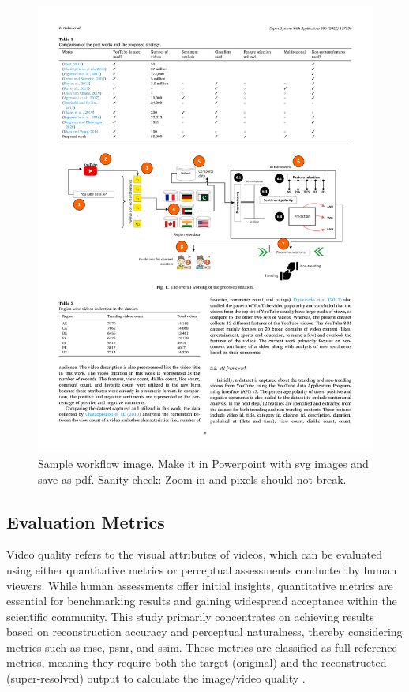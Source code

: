 \documentclass[conference]{IEEEtran}
\begin{document}
\begin{figure}[htbp]
\centerline{\includegraphics[width=17.8cm]{Figure3b.pdf}}
\caption{Sample workflow image. Make it in Powerpoint with svg images and save as pdf. Sanity check: Zoom in and pixels should not break.}
\label{Fig:Figure3b}
\end{figure}

\subsection{Evaluation Metrics}
Video quality refers to the visual attributes of videos, which can be evaluated using either quantitative metrics or perceptual assessments conducted by human viewers. While human assessments offer initial insights, quantitative metrics are essential for benchmarking results and gaining widespread acceptance within the scientific community. This study primarily concentrates on achieving results based on reconstruction accuracy and perceptual naturalness, thereby considering metrics such as \acrfull{mse}, \acrfull{psnr}, and \acrfull{ssim}. These metrics are classified as full-reference metrics, meaning they require both the target (original) and the reconstructed (super-resolved) output to calculate the image/video quality \cite{deep_learning_image_sr_2020}.
\end{document}
